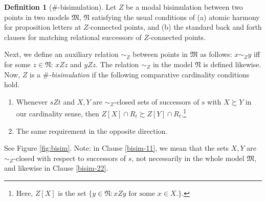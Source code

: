 \documentclass[12pt,oneside,reqno]{amsart}
\theoremstyle{definition}
\newtheorem{definition}{Definition}
\begin{document}
\begin{definition}[$\#$-bisimulation] \label{def:bisim} Let $Z$ be a  modal bisimulation between two points in two models $\mathfrak{M}$,  $\mathfrak{N}$ satisfying the usual conditions of (a) atomic harmony for proposition letters at $Z$-connected points, and (b) the standard back and forth clauses for matching relational successors of $Z$-connected points. 

Next, we define an auxiliary relation $\sim_Z$ between points in $\mathfrak{M}$ as follows: $x \sim_Z y$ iff for some $z \in \mathfrak{N}$: $x Z z$ and $y Z z$. The relation $\sim_Z$ in the model $\mathfrak{N}$ is defined likewise. Now, $Z$ is a \emph{$\#$-bisimulation} if the following comparative cardinality conditions hold. \vspace{0.5ex}


\begin{enumerate}[label=(\alph*)] \item \label{bisim-11} Whenever $s Z t$ and $X, Y$ are $\sim_Z$-closed sets of successors of $s$ with $X \succsim Y$ in our cardinality sense, then $Z[X] \cap R_t \succsim Z[Y] \cap R_t$.\footnote{Here, $Z[X]$ is the set $\{y \in \mathfrak{N}: xZy\mbox{ for some }x\in X.\}$.} \item \label{bisim-22}\vspace{1mm}
The same requirement in the opposite direction. \end{enumerate} 
\end{definition}

See Figure \ref{fig:bisim}. Note: in Clause \ref{bisim-11}, we mean that the sets $X, Y$ are $\sim_Z$-closed with respect to successors of $s$, not necessarily in the whole model $\mathfrak{M}$, and likewise in Clause \ref{bisim-22}. 
\end{document}
